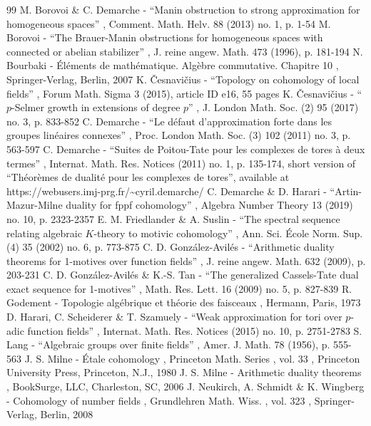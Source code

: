 \documentclass[11pt]{article}
\theoremstyle{plain}
\theoremstyle{definition}
\begin{document}
\begin{thebibliography}{99}
 M. Borovoi \& C. Demarche - “Manin obstruction to strong approximation for homogeneous spaces” , Comment. Math. Helv. 88 (2013) no. 1, p. 1-54
 M. Borovoi - “The Brauer-Manin obstructions for homogeneous spaces with connected or abelian stabilizer” , J. reine angew. Math. 473 (1996), p. 181-194
 N. Bourbaki - Éléments de mathématique. Algèbre commutative. Chapitre 10 , Springer-Verlag, Berlin, 2007
 K. Česnavičius - “Topology on cohomology of local fields” , Forum Math. Sigma 3 (2015), article ID e16, 55 pages
 K. Česnavičius - “$p$-Selmer growth in extensions of degree $p$” , J. London Math. Soc. (2) 95 (2017) no. 3, p. 833-852
 C. Demarche - “Le défaut d’approximation forte dans les groupes linéaires connexes” , Proc. London Math. Soc. (3) 102 (2011) no. 3, p. 563-597
 C. Demarche - “Suites de Poitou-Tate pour les complexes de tores à deux termes” , Internat. Math. Res. Notices (2011) no. 1, p. 135-174, short version of “Théorèmes de dualité pour les complexes de tores”, available at https://webusers.imj-prg.fr/\textasciitilde{}cyril.demarche/
 C. Demarche \& D. Harari - “Artin-Mazur-Milne duality for fppf cohomology” , Algebra Number Theory 13 (2019) no. 10, p. 2323-2357
 E. M. Friedlander \& A. Suslin - “The spectral sequence relating algebraic $K$-theory to motivic cohomology” , Ann. Sci. École Norm. Sup. (4) 35 (2002) no. 6, p. 773-875
 C. D. González-Avilés - “Arithmetic duality theorems for 1-motives over function fields” , J. reine angew. Math. 632 (2009), p. 203-231
 C. D. González-Avilés \& K.-S. Tan - “The generalized Cassels-Tate dual exact sequence for 1-motives” , Math. Res. Lett. 16 (2009) no. 5, p. 827-839
 R. Godement - Topologie algébrique et théorie des faisceaux , Hermann, Paris, 1973
 D. Harari, C. Scheiderer \& T. Szamuely - “Weak approximation for tori over $p$-adic function fields” , Internat. Math. Res. Notices (2015) no. 10, p. 2751-2783
 S. Lang - “Algebraic groups over finite fields” , Amer. J. Math. 78 (1956), p. 555-563
 J. S. Milne - Étale cohomology , Princeton Math. Series , vol. 33 , Princeton University Press, Princeton, N.J., 1980
 J. S. Milne - Arithmetic duality theorems , BookSurge, LLC, Charleston, SC, 2006
 J. Neukirch, A. Schmidt \& K. Wingberg - Cohomology of number fields , Grundlehren Math. Wiss. , vol. 323 , Springer-Verlag, Berlin, 2008

\end{thebibliography}
\end{document}
